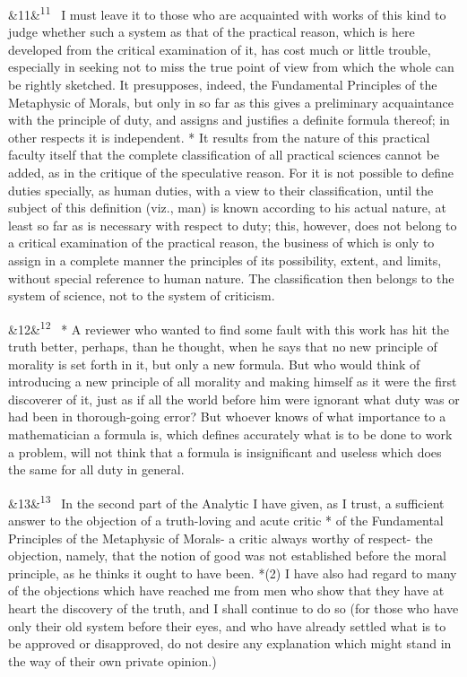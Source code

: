 \documentclass[12pt]{article}
\newcommand{\para}[1][]{\par\noindent\ifx&#1&\else\textsuperscript{\footnotesize #1}~\fi}
\begin{document}
\para[11] I must leave it to those who are acquainted with works of this kind to judge whether such a system as that of the practical reason, which is here developed from the critical examination of it, has cost much or little trouble, especially in seeking not to miss the true point of view from which the whole can be rightly sketched. It presupposes, indeed, the Fundamental Principles of the Metaphysic of Morals, but only in so far as this gives a preliminary acquaintance with the principle of duty, and assigns and justifies a definite formula thereof; in other respects it is independent. * It results from the nature of this practical faculty itself that the complete classification of all practical sciences cannot be added, as in the critique of the speculative reason. For it is not possible to define duties specially, as human duties, with a view to their classification, until the subject of this definition (viz., man) is known according to his actual nature, at least so far as is necessary with respect to duty; this, however, does not belong to a critical examination of the practical reason, the business of which is only to assign in a complete manner the principles of its possibility, extent, and limits, without special reference to human nature. The classification then belongs to the system of science, not to the system of criticism.

\para[12] * A reviewer who wanted to find some fault with this work has hit the truth better, perhaps, than he thought, when he says that no new principle of morality is set forth in it, but only a new formula. But who would think of introducing a new principle of all morality and making himself as it were the first discoverer of it, just as if all the world before him were ignorant what duty was or had been in thorough-going error? But whoever knows of what importance to a mathematician a formula is, which defines accurately what is to be done to work a problem, will not think that a formula is insignificant and useless which does the same for all duty in general.

\para[13] In the second part of the Analytic I have given, as I trust, a sufficient answer to the objection of a truth-loving and acute critic * of the Fundamental Principles of the Metaphysic of Morals- a critic always worthy of respect- the objection, namely, that the notion of good was not established before the moral principle, as he thinks it ought to have been. *(2) I have also had regard to many of the objections which have reached me from men who show that they have at heart the discovery of the truth, and I shall continue to do so (for those who have only their old system before their eyes, and who have already settled what is to be approved or disapproved, do not desire any explanation which might stand in the way of their own private opinion.)
\end{document}
